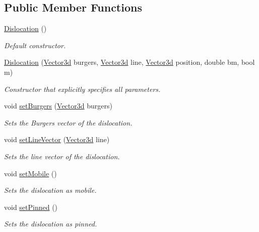 \subsection*{\-Public \-Member \-Functions}
\begin{DoxyCompactItemize}
\item 
\hyperlink{classDislocation_ac5eed47d88651f3f2ed7f090036f804e}{\-Dislocation} ()
\begin{DoxyCompactList}\small\item\em \-Default constructor. \end{DoxyCompactList}\item 
\hyperlink{classDislocation_a332cb83378000624b6eea474ca31a8c2}{\-Dislocation} (\hyperlink{classVector3d}{\-Vector3d} burgers, \hyperlink{classVector3d}{\-Vector3d} line, \hyperlink{classVector3d}{\-Vector3d} position, double bm, bool m)
\begin{DoxyCompactList}\small\item\em \-Constructor that explicitly specifies all parameters. \end{DoxyCompactList}\item 
void \hyperlink{classDislocation_ab827fcf321729c1238caaa3bceff323a}{set\-Burgers} (\hyperlink{classVector3d}{\-Vector3d} burgers)
\begin{DoxyCompactList}\small\item\em \-Sets the \-Burgers vector of the dislocation. \end{DoxyCompactList}\item 
void \hyperlink{classDislocation_a6e814df21c8dfbd1e2e8f492673a79b2}{set\-Line\-Vector} (\hyperlink{classVector3d}{\-Vector3d} line)
\begin{DoxyCompactList}\small\item\em \-Sets the line vector of the dislocation. \end{DoxyCompactList}\item 
void \hyperlink{classDislocation_a59d404cb0d3dbaaa3380e4fd4018c4d3}{set\-Mobile} ()
\begin{DoxyCompactList}\small\item\em \-Sets the dislocation as mobile. \end{DoxyCompactList}\item 
void \hyperlink{classDislocation_a769db83b0546e7785b5890a5979a8d82}{set\-Pinned} ()
\begin{DoxyCompactList}\small\item\em \-Sets the dislocation as pinned. \end{DoxyCompactList}\item 

\end{DoxyCompactItemize}
